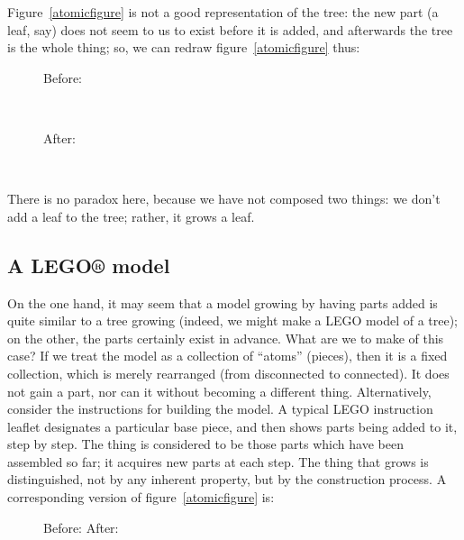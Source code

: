\documentclass[english,a5paper]{scrartcl}
\newlength{\largeboxwidth}\setlength{\largeboxwidth}{4em}
\newlength{\boldfboxrule}\setlength{\boldfboxrule}{3\fboxrule}
\newlength{\origfboxrule}\setlength{\origfboxrule}{\fboxrule}
\newcommand{\boldframebox}[2][\width+2\fboxsep]{{\setlength{\fboxrule}{\boldfboxrule}\framebox[#1]{#2}}}
\newcommand{\boldfbox}[1]{\boldframebox{#1}}
\begin{document}
Figure~\ref{atomicfigure} is not a good representation of the tree: the new part (a leaf, say) does not seem to us to exist before it is added, and afterwards the tree is the whole thing; so, we can redraw figure~\ref{atomicfigure} thus:

\newsavebox{\combinedthing}%
\begin{figure}[h]
  \centering%
  Before: \begin{varwidth}[t]{1in}\framebox[\largeboxwidth]{\vphantom{A}}\\\end{varwidth}
  \hspace{5ex}%
  After: \begin{varwidth}[t]{1in}\usebox{\combinedthing}\\\end{varwidth}
  \caption{}
  \label{treefigure}
\end{figure}

There is no paradox here, because we have not composed two things: we don’t add a leaf to the tree; rather, it grows a leaf.

\subsection{A LEGO® model}

On the one hand, it may seem that a model growing by having parts added is quite similar to a tree growing (indeed, we might make a LEGO model of a tree); on the other, the parts certainly exist in advance. What are we to make of this case? If we treat the model as a collection of “atoms” (pieces), then it is a fixed collection, which is merely rearranged (from disconnected to connected). It does not gain a part, nor can it without becoming a different thing. Alternatively, consider the instructions for building the model. A typical LEGO instruction leaflet designates a particular base piece, and then shows parts being added to it, step by step. The thing is considered to be those parts which have been assembled so far; it acquires new parts at each step. The thing that grows is distinguished, not by any inherent property, but by the construction process. A corresponding version of figure~\ref{atomicfigure} is:

\newsavebox{\partthing}%
\begin{figure}[h]
  \centering%
  Before: \boldframebox[\largeboxwidth]{A}\hspace{1em}\hspace{5ex}%
  After: \boldfbox{\makebox[\largeboxwidth]{A}\raisebox{0pt}[0pt][0pt]{\rule[-\dp\partthing]{\origfboxrule}{\ht\partthing+\dp\partthing}}\hspace{\fboxsep}\hspace{-1\origfboxrule}B}%
  \caption{}%
  \label{legofigure}
\end{figure}
\end{document}
